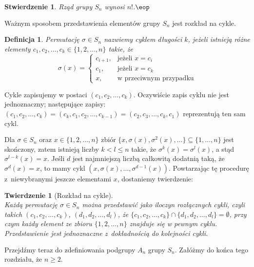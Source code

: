 \documentclass[licencjacka]{pracamgr}
\newtheorem{deff}{Definicja}[section]
\newtheorem{thh}{Twierdzenie}[section]
\newtheorem{fact}{Stwierdzenie}[section]
\begin{document}
\begin{fact}
    Rząd grupy $S_n$ wynosi $n!$.\quad$\eop$
\end{fact}

Ważnym sposobem przedstawienia elementów grupy $S_n$ jest rozkład na
cykle.

\begin{deff}
    Permutację $\sigma \in S_n$ nazwiemy \emph{cyklem długości $k$},
    jeżeli istnieją różne elementy $c_1, c_2, \ldots, c_k \in \{1, 2, \ldots, n\}$ takie, że
    $$ \sigma(x) = \left\{
                \begin{array}{ll}
                    c_{i+1}, & \textrm{jeżeli $x = c_i$}\\
                    c_1,     & \textrm{jeżeli $x = c_k$}\\
                    x,       & \textrm{w przeciwnym przypadku}
                \end{array} \right.
    $$
\end{deff}

Cykle zapisujemy w postaci $(c_1, c_2, \ldots, c_k)$. Oczywiście zapis cyklu nie jest jednoznaczny; 
następujące zapisy: $(c_1, c_2, \ldots, c_k) = (c_k, c_1, c_2, \ldots, c_{k-1}) = (c_2, c_3, \ldots, c_k,
c_1)$ reprezentują ten sam cykl.

Dla $\sigma \in S_n$ oraz $x\in\{1, 2,\ldots, n\}$ zbiór
$\{x,\sigma(x),\sigma^2(x),\ldots\}\subseteq\{1,\ldots,n\}$ jest skończony, zatem istnieją
liczby $k<l\leq n$ takie, że $\sigma^k(x)=\sigma^l(x)$, a stąd $\sigma^{l-k}(x)=x$. Jeśli $d$ jest najmniejszą
liczbą całkowitą dodatnią taką, że $\sigma^d(x)=x$, to mamy cykl $\left(x,\sigma(x),\ldots,\sigma^{d-1}(x)\right)$.
Powtarzając tę procedurę z~niewybranymi jeszcze elementami $x$, dostaniemy twierdzenie:

\begin{thh} [Rozkład na cykle] $ $ \\
    Każdą permutację $\sigma \in S_n$ można przedstawić jako iloczyn rozłącznych cykli,
    czyli takich $(c_1, c_2, \ldots, c_k)$, $(d_1, d_2, \ldots, d_l)$, że $\{ c_1, c_2, \ldots, c_k \} \cap \{ d_1, d_2, \ldots, d_l \} = \emptyset$,
    przy czym każdy element ze zbioru $\{1, 2, \ldots, n\}$ znajduje się w pewnym cyklu.
    Przedstawienie jest jednoznaczne z~dokładnością do kolejności cykli.
\end{thh}

\pagebreak[2]

Przejdźmy teraz do zdefiniowania podgrupy $A_n$ grupy $S_n$. Załóżmy
do końca tego rozdziału, że $n \ge 2$.
\end{document}
